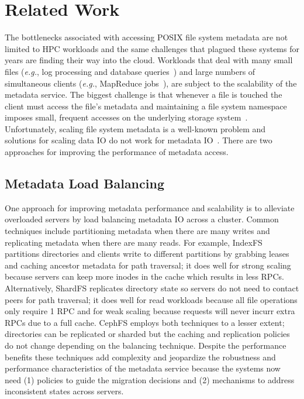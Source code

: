 \documentclass[preprint]{sigplanconf-eurosys}
\begin{document}
\section{Related Work} 

The bottlenecks associated with accessing POSIX file system metadata are not limited
to HPC workloads and the same challenges that plagued these systems for years are
finding their way into the cloud. Workloads that deal with many small files
({\it e.g.}, log processing and database
queries~\cite{thusoo:sigmod2010-facebook-infrastructure}) and large numbers of
simultaneous clients ({\it e.g.}, MapReduce
jobs~\cite{mckusick:acm2010-gfs-evolution}), are subject to the scalability of
the metadata service. The biggest challenge is that whenever a file
is touched the client must access the file's metadata and maintaining a file
system namespace imposes small, frequent accesses on the underlying storage
system~\cite{roselli:atec2000-FS-workloads}.  Unfortunately, scaling file
system metadata is a well-known problem and solutions for scaling data IO do
not work for metadata IO~\cite{roselli:atec2000-FS-workloads,
abad:techreport2012-fstrace, abad:ucc2012-mimesis,
alam:pdsw2011-metadata-scaling, weil:osdi2006-ceph}. There are two approaches
for improving the performance of metadata access.

\subsection{Metadata Load Balancing}

One approach for improving metadata performance and scalability is to alleviate
overloaded servers by load balancing metadata IO across a cluster. Common
techniques include partitioning metadata when there are many writes and
replicating metadata when there are many reads. For example, IndexFS partitions
directories and clients write to different partitions by grabbing leases and
caching ancestor metadata for path traversal; it does well for strong scaling
because servers can keep more inodes in the cache which results in less RPCs.
Alternatively, ShardFS replicates directory state so servers do not need to
contact peers for path traversal; it does well for read workloads because all
file operations only require 1 RPC and for weak scaling because requests will
never incurr extra RPCs due to a full cache.  CephFS employs both techniques to
a lesser extent; directories can be replicated or sharded but the caching and
replication policies do not change depending on the balancing technique.
Despite the performance benefits these techniques add complexity and jeopardize
the robustness and performance characteristics of the metadata service because
the systems now need (1) policies to guide the migration decisions and (2)
mechanisms to address inconsistent states across servers.
\end{document}
